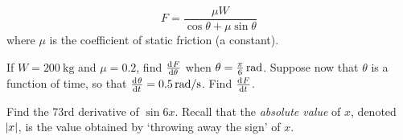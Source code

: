 \begin{questions}
\begin{displaymath}
              F = \frac{\mu W}{\cos \theta + \mu \sin \theta}
            \end{displaymath}
            where $ \mu $ is the coefficient of static friction (a constant).
    \begin{parts}
      \parA If $ W = \SI{200}{\kilo\gram} $ and $ \mu = 0.2 $, find $ \od{F}{\theta} $ when $ \theta = \frac{\pi}{6}\thinspace\si{\radian} $.
      \parM Suppose now that $ \theta $ is a function of time, so that $ \od{\theta}{t} = \SI{0.5}{\radian / \second} $. Find $ \od{F}{t} $.
    \end{parts}
  \questioE Find the 73rd derivative of $ \sin 6x $.
  \questioE Recall that the \emph{absolute value} of $ x $, denoted $ \abs{x} $, is the value obtained by `throwing away the sign' of $ x $.
\end{questions}

